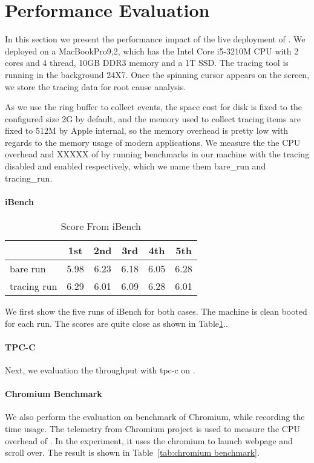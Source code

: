 \section{Performance Evaluation}\label{sec:evaluation}

In this section we present the performance impact of the live deployment of
\xxx. We deployed \xxx on a MacBookPro9,2, which has the Intel Core i5-3210M CPU
with 2 cores and 4 thread, 10GB DDR3 memory and a 1T SSD. The tracing tool is
running in the background 24X7. Once the spinning cursor appears on the screen,
we store the tracing data for root cause analysis.

As we use the ring buffer to collect events, the space cost for disk is fixed
to the configured size 2G by default, and the memory used to collect tracing
items are fixed to 512M by Apple internal, so the memory overhead is pretty low
with regards to the memory usage of modern applications. We measure the the CPU
overhead and XXXXX of \xxx by running benchmarks in our machine with the tracing disabled and
enabled respectively, which we name them bare\_run and tracing\_run.

\paragraph{iBench}
\begin{table}[ht]
\begin{tabular}{l|c|c|c|c|c}
\hline
 & 1st & 2nd & 3rd & 4th & 5th\\
\hline
 bare run & 5.98 & 6.23 & 6.18 & 6.05 & 6.28\\
\hline
 tracing run& 6.29 & 6.01 & 6.09 & 6.28 & 6.01\\
\hline
\end{tabular}
\caption{Score From iBench}
\label{tab:ibench}
\end{table}

We first show the five runs of iBench for both cases. The machine is
clean booted for each run. The scores are quite close as shown in
Table\ref{tab:ibench}..

\paragraph{TPC-C}
Next, we evaluation the throughput with tpc-c on \xxx.

\paragraph{Chromium Benchmark}
We also perform the evaluation on benchmark of Chromium, while recording the
time usage. The telemetry from Chromium project is used to measure the CPU
overhead of \xxx. In the experiment, it uses the chromium to launch webpage and
scroll over. The result is shown in Table~\ref{tab:chromium benchmark}.

